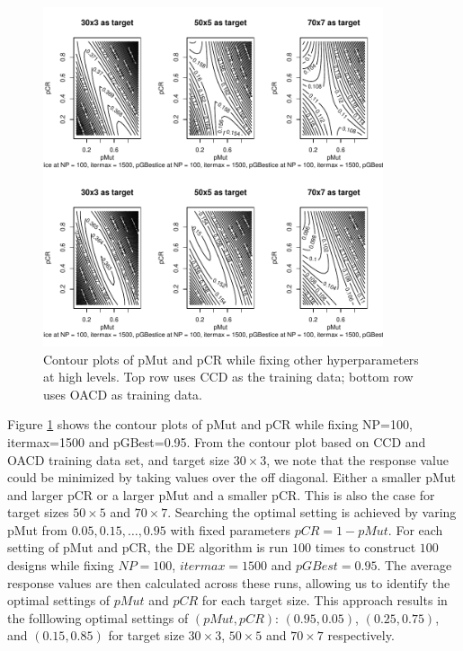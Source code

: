 \documentclass [PhD] {package/uclathes}
\begin{document}

\begin{figure}
\centering
\includegraphics[height=10cm, width=\textwidth]{chapters/DE/pdfs/contours}
\caption{Contour plots of pMut and pCR while fixing other hyperparameters at high levels. Top row uses CCD as the training data; bottom row uses OACD as training data.}
\label{fig:contours}
\end{figure}

Figure \ref{fig:contours} shows the contour plots of pMut and pCR while fixing NP=100, itermax=1500 and pGBest=0.95. From the contour plot based on CCD and OACD training data set, and target size $30\times 3$, we note that the response value could be minimized by taking values over the off diagonal. Either a smaller pMut and larger pCR or a larger pMut and a smaller pCR. This is also the case for target sizes $50\times5$ and $70\times 7$. Searching the optimal setting is achieved by  varing pMut from $0.05, 0.15, \ldots, 0.95$ with fixed parameters $pCR=1-pMut$. For each setting of pMut and pCR, the DE algorithm is run $100$ times to construct $100$ designs while fixing $NP=100$, $itermax=1500$ and $pGBest=0.95$. The average response values are then calculated across these runs, allowing us to identify the optimal settings of $pMut$ and $pCR$ for each target size. This approach results in the folllowing optimal settings of $(pMut, pCR)$: $(0.95, 0.05)$, $(0.25, 0.75)$, and $(0.15, 0.85)$ for target size $30\times3$, $50\times5$ and $70\times7$ respectively.
\end{document}
